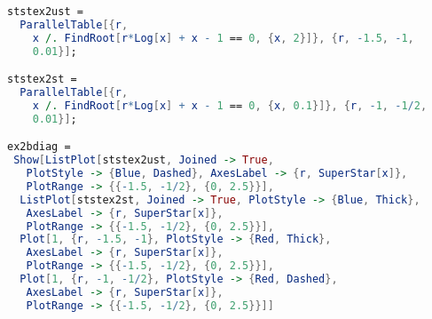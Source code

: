 \begin{lstlisting}[language=Mathematica]
ststex2ust = 
  ParallelTable[{r, 
    x /. FindRoot[r*Log[x] + x - 1 == 0, {x, 2}]}, {r, -1.5, -1, 
    0.01}];

ststex2st = 
  ParallelTable[{r, 
    x /. FindRoot[r*Log[x] + x - 1 == 0, {x, 0.1}]}, {r, -1, -1/2, 
    0.01}];

ex2bdiag = 
 Show[ListPlot[ststex2ust, Joined -> True, 
   PlotStyle -> {Blue, Dashed}, AxesLabel -> {r, SuperStar[x]}, 
   PlotRange -> {{-1.5, -1/2}, {0, 2.5}}], 
  ListPlot[ststex2st, Joined -> True, PlotStyle -> {Blue, Thick}, 
   AxesLabel -> {r, SuperStar[x]}, 
   PlotRange -> {{-1.5, -1/2}, {0, 2.5}}], 
  Plot[1, {r, -1.5, -1}, PlotStyle -> {Red, Thick}, 
   AxesLabel -> {r, SuperStar[x]}, 
   PlotRange -> {{-1.5, -1/2}, {0, 2.5}}], 
  Plot[1, {r, -1, -1/2}, PlotStyle -> {Red, Dashed}, 
   AxesLabel -> {r, SuperStar[x]}, 
   PlotRange -> {{-1.5, -1/2}, {0, 2.5}}]]
\end{lstlisting}  


